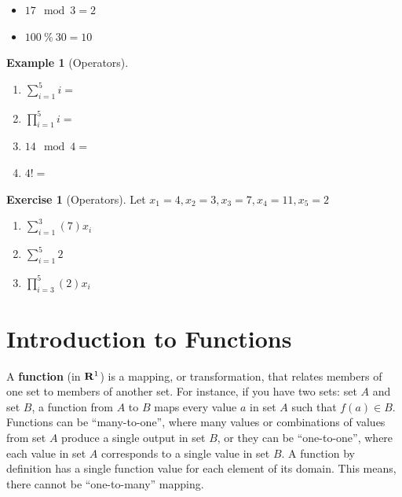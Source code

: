 \documentclass[]{book}
\providecommand{\tightlist}{%
  \setlength{\itemsep}{0pt}\setlength{\parskip}{0pt}}
\theoremstyle{definition}
\theoremstyle{definition}
\newtheorem{example}{Example}[chapter]
\theoremstyle{definition}
\newtheorem{exercise}{Exercise}[chapter]
\theoremstyle{remark}
\begin{document}
\begin{itemize}
\tightlist
\item
  \(17 \mod 3 = 2\)
\item
  \(100 \ \% \ 30 = 10\)
\end{itemize}

\begin{example}[Operators]
\protect\hypertarget{exm:operators}{}{\label{exm:operators} {} }

\begin{enumerate}
\def\labelenumi{\arabic{enumi}.}
\item
  \(\sum\limits_{i=1}^{5} i =\)
\item
  \(\prod\limits_{i=1}^{5} i =\)
\item
  \(14 \mod 4 =\)
\item
  \(4! =\)
\end{enumerate}
\end{example}

\begin{exercise}[Operators]
\protect\hypertarget{exr:operators1}{}{\label{exr:operators1} {} }Let \(x_1 = 4, x_2 = 3, x_3 = 7, x_4 = 11, x_5 = 2\)

\begin{enumerate}
\def\labelenumi{\arabic{enumi}.}
\item
  \(\sum\limits_{i=1}^{3} (7)x_i\)
\item
  \(\sum\limits_{i=1}^{5} 2\)
\item
  \(\prod\limits_{i=3}^{5} (2)x_i\)
\end{enumerate}
\end{exercise}

\hypertarget{introduction-to-functions}{%
\section{Introduction to Functions}\label{introduction-to-functions}}

A \textbf{function} (in \({\bf R}^1\)) is a mapping, or transformation, that relates members of one set to members of another set. For instance, if you have two sets: set \(A\) and set \(B\), a function from \(A\) to \(B\) maps every value \(a\) in set \(A\) such that \(f(a) \in B\). Functions can be ``many-to-one'', where many values or combinations of values from set \(A\) produce a single output in set \(B\), or they can be ``one-to-one'', where each value in set \(A\) corresponds to a single value in set \(B\). A function by definition has a single function value for each element of its domain. This means, there cannot be ``one-to-many'' mapping.
\end{document}
